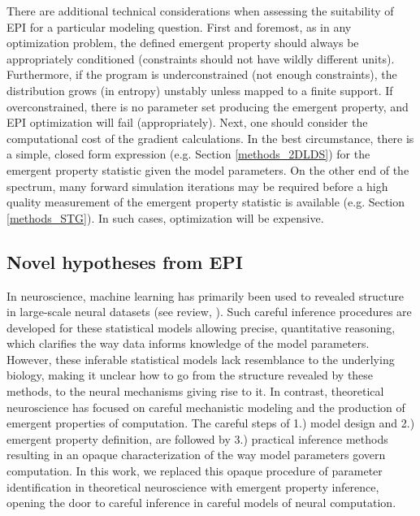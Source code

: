 \documentclass[11pt]{article}
\begin{document}
There are additional technical considerations when assessing the suitability of EPI for a particular modeling question.  
First and foremost, as in any optimization problem, the defined emergent property should always be appropriately conditioned (constraints should not have wildly different units).  
Furthermore, if the program is underconstrained (not enough constraints), the distribution grows (in entropy) unstably unless mapped to a finite support.  
If overconstrained, there is no parameter set producing the emergent property, and EPI optimization will fail (appropriately).
Next, one should consider the computational cost of the gradient calculations. 
In the best circumstance, there is a simple, closed form expression (e.g. Section \ref{methods_2DLDS}) for the emergent property statistic given the model parameters.  
On the other end of the spectrum, many forward simulation iterations may be required before a high quality measurement of the emergent property statistic is available  (e.g. Section \ref{methods_STG}).  In such cases, optimization will be expensive.

\subsection{Novel hypotheses from EPI} 
In neuroscience, machine learning has primarily been used to revealed structure in large-scale neural datasets \cite{kass2001spike, brown1998statistical, paninski2004maximum, byron2009gaussian, latimer2015single, duncker2019learning} (see review, \cite{paninski2018neural}).  Such careful inference procedures are developed for these statistical models allowing precise, quantitative reasoning, which clarifies the way data informs knowledge of the model parameters.  However, these inferable statistical models lack resemblance to the underlying biology, making it unclear how to go from the structure revealed by these methods, to the neural mechanisms giving rise to it.  In contrast, theoretical neuroscience has focused on careful mechanistic modeling and the production of emergent properties of computation.  The careful steps of 1.) model design and 2.) emergent property definition, are followed by 3.) practical inference methods resulting in an opaque characterization of the way model parameters govern computation.  In this work, we replaced this opaque procedure of parameter identification in theoretical neuroscience with emergent property inference, opening the door to careful inference in careful models of neural computation.
\end{document}
